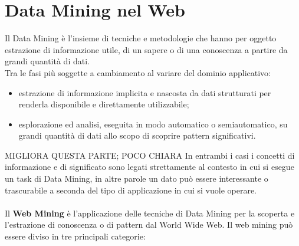 \section{Data Mining nel Web}
Il Data Mining è l'insieme di tecniche e metodologie che hanno per oggetto estrazione di informazione utile, di un sapere o di una conoscenza a partire da grandi quantità di dati.
\\
Tra le fasi più soggette a cambiamento al variare del dominio applicativo:
\begin{itemize}
\item estrazione di informazione implicita e nascosta da dati strutturati per renderla disponibile e direttamente utilizzabile; 
\item esplorazione ed analisi, eseguita in modo automatico o semiautomatico, su grandi quantità di dati allo scopo di scoprire pattern significativi.
\end{itemize}
\color{red} MIGLIORA QUESTA PARTE; POCO CHIARA
In entrambi i casi i concetti di informazione e di significato sono legati strettamente al contesto in cui si esegue un task di Data Mining, \color{black} in altre parole un dato può essere interessante o trascurabile a seconda del tipo di applicazione in cui si vuole operare.
\\\\
Il \textbf{Web Mining} è l’applicazione delle tecniche di Data Mining per la scoperta e l’estrazione di conoscenza o di pattern dal World Wide Web.
Il web mining può essere diviso in tre principali categorie:
